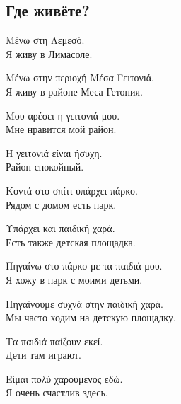 \documentclass[12pt]{article}
\newcommand{\my}[1]{\textcolor{gray!80!white}{#1}}
\newenvironment{page}{\clearpage\normalsize\null\vfill}{\vfill\null}
\newenvironment{textblock}{\begin{minipage}{\textwidth}}{\end{minipage}\smallskip}
\begin{document}
	\begin{page}
		\subsection{Где живёте?}
		\small
		\begin{textblock}
			Μένω στη Λεμεσό.\\
			\my{Я живу в Лимасоле.}
			
			Μένω στην περιοχή Μέσα Γειτονιά.\\
			\my{Я живу в районе Меса Гетония.}
			
			Μου αρέσει η γειτονιά μου.\\
			\my{Мне нравится мой район.}
			
			Η γειτονιά είναι ήσυχη.\\
			\my{Район спокойный.}
			
			Κοντά στο σπίτι υπάρχει πάρκο.\\
			\my{Рядом с домом есть парк.}
			
			Υπάρχει και παιδική χαρά.\\
			\my{Есть также детская площадка.}
			
			Πηγαίνω στο πάρκο με τα παιδιά μου.\\
			\my{Я хожу в парк с моими детьми.}
			
			Πηγαίνουμε συχνά στην παιδική χαρά.\\
			\my{Мы часто ходим на детскую площадку.}
			
			Τα παιδιά παίζουν εκεί.\\
			\my{Дети там играют.}
			
			Είμαι πολύ χαρούμενος εδώ.\\
			\my{Я очень счастлив здесь.}
		\end{textblock}
	\end{page}
	
\end{document}
